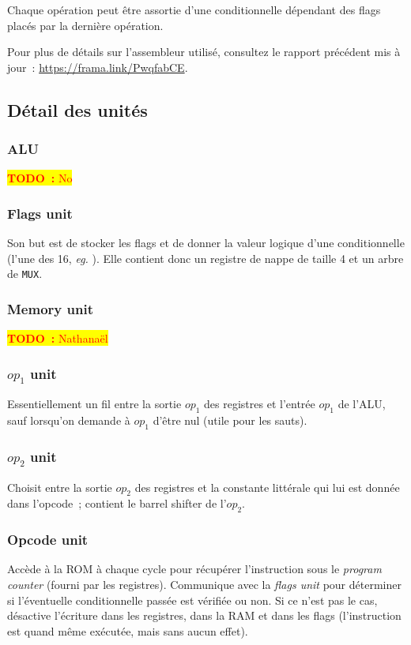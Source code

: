 \documentclass[11pt,a4paper]{article}
\newcommand{\todo}[1]{\colorbox{yellow}{\textcolor{red}{\textbf{TODO~:} #1}}}
\begin{document}
Chaque opération peut être assortie d'une conditionnelle dépendant des flags placés par la dernière opération.

Pour plus de détails sur l'assembleur utilisé, consultez le rapport précédent mis à jour~: \url{https://frama.link/PwqfabCE}.

\subsection{Détail des unités}

\subsubsection{ALU} \label{sssec:procunit_alu}
\todo{No}

\subsubsection{Flags unit}

Son but est de stocker les flags et de donner la valeur logique d'une conditionnelle (l'une des 16, \textit{eg.} ). Elle contient donc un registre de nappe de taille 4 et un arbre de \texttt{MUX}.

\subsubsection{Memory unit} \label{sssec:procunit_mem}
\todo{Nathanaël}

\subsubsection{$op_1$ unit}
Essentiellement un fil entre la sortie $op_1$ des registres et l'entrée $op_1$ de l'ALU, sauf lorsqu'on demande à $op_1$ d'être nul (utile pour les sauts).

\subsubsection{$op_2$ unit}
Choisit entre la sortie $op_2$ des registres et la constante littérale qui lui est donnée dans l'opcode~; contient le barrel shifter de l'$op_2$.

\subsubsection{Opcode unit} \label{sssec:procunit_opcode}
Accède à la ROM à chaque cycle pour récupérer l'instruction sous le \textit{program counter} (fourni par les registres). Communique avec la \textit{flags unit} pour déterminer si l'éventuelle conditionnelle passée est vérifiée ou non. Si ce n'est pas le cas, désactive l'écriture dans les registres, dans la RAM et dans les flags (l'instruction est quand même exécutée, mais sans aucun effet).
\end{document}
